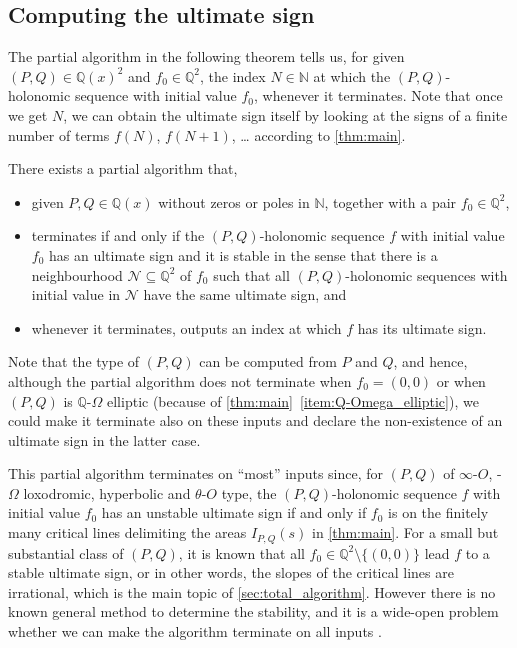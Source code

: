 \documentclass[a4paper,UKenglish,cleveref,autoref,thm-restate]{lipics-v2021}
\newcommand{\N}{\mathbb{N}}
\newcommand{\Q}{\mathbb{Q}}
\begin{document}
\subsection{Computing the ultimate sign}
\label{subsection: main result algorithm}

The partial algorithm in the following theorem tells us, for given $(P, Q) \in \Q(x)^2$ and $f_0 \in \Q^2$, the index $N \in \N$ at which the $(P, Q)$-holonomic sequence with initial value $f_0$, whenever it terminates. 
Note that once we get $N$, 
we can obtain the ultimate sign itself
by looking at the signs of 
a finite number of terms $f (N)$, $f (N + 1)$, \ldots
according to \cref{thm:main}. 

\begin{theorem}\label{thm:procedure}
There exists a partial algorithm that, 
\begin{itemize}
\item 
given 
$P, Q \in \Q(x)$ without zeros or poles in $\N$, 
together with a pair $f_0 \in \Q^2$,
\item 
terminates if and only if 
the $(P, Q)$-holonomic sequence $f$ with initial value $f_0$
has an ultimate sign
and it is stable 
in the sense that there is a neighbourhood $\mathcal{N} \subseteq \Q^2$ of $f_0$
such that all $(P, Q)$-holonomic sequences with initial value in $\mathcal{N}$ have the same ultimate sign, 
and
\item 
whenever it terminates, 
outputs an index at which $f$ has its ultimate sign.
\end{itemize}
\end{theorem}

Note that the type of $(P, Q)$ can be computed from $P$ and $Q$, 
and hence, 
although the partial algorithm does not terminate
when $f_0 = (0, 0)$ or when $(P, Q)$ is $\Q$-$\Omega$ elliptic
(because of \cref{thm:main}~\eqref{item:Q-Omega_elliptic}), 
we could make it terminate also on these inputs
and declare the non-existence of an ultimate sign in the latter case. 

This partial algorithm terminates on ``most'' inputs since, for $(P, Q)$ of $\infty$-$O$, -$\Omega$ loxodromic, hyperbolic and $\theta$-$O$ type, the $(P, Q)$-holonomic sequence $f$ with initial value $f_0$ has an unstable ultimate sign if and only if $f_0$ is on the finitely many critical lines delimiting the areas $I_{P, Q}(s)$ in \cref{thm:main}. 
For a small but substantial class of $(P, Q)$, it is known that all $f_0 \in \Q^2 \setminus \{(0, 0) \}$ lead $f$ to a stable ultimate sign, or in other words, the slopes of the critical lines are irrational, which is the main topic of \cref{sec:total_algorithm}. 
However there is no known general method to determine the stability, and it is a wide-open problem whether we can make the algorithm terminate on all inputs \cite{KKL+21,IS24,NOW21}. 
\end{document}
